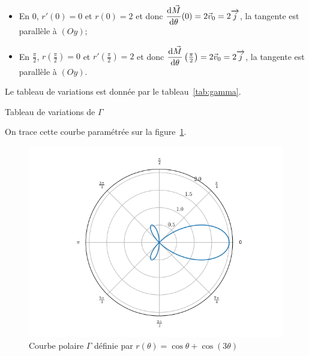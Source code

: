 \begin{itemize}
  \item En \(0\), \(r'(0)=0\) et \(r(0)=2\) et donc 
    \(\dfrac{\mathrm{d} \vec{M}}{\mathrm{d} \theta}(0)=2 \vec{v}_0 = 2 \overrightarrow{j}\), la tangente est 
    parallèle à \((Oy)\);
  \item En \(\frac{\pi}{2}\), \(r\left(\frac{\pi}{2}\right)=0\) et 
    \(r'\left(\frac{\pi}{2}\right)=2\) et donc 
    \(\dfrac{\mathrm{d} \vec{M}}{\mathrm{d} \theta}\left(\frac{\pi}{2}\right)=2 \vec{v}_0 = 2 
    \overrightarrow{j}\), la tangente est parallèle à \((Oy)\).
\end{itemize}

Le tableau de variations est donnée par le tableau~\ref{tab:gamma}.

\begin{table}
  \centering   {}
  \caption{Tableau de variations de $\Gamma$}
  \label{tab:gamma}
\end{table}

On trace cette courbe paramétrée sur la figure~\ref{fig:pol}.
\begin{figure}
  \centering
  \includegraphics[scale = 1]{courbepolaire.png}
  \caption{Courbe polaire $\Gamma$ définie par \(r(\theta)=\cos\theta + 
  \cos(3\theta)\)}
  \label{fig:pol}
\end{figure}
\clearpage
